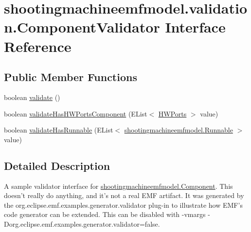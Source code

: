 \hypertarget{interfaceshootingmachineemfmodel_1_1validation_1_1_component_validator}{\section{shootingmachineemfmodel.\-validation.\-Component\-Validator Interface Reference}
\label{interfaceshootingmachineemfmodel_1_1validation_1_1_component_validator}
}
\subsection*{Public Member Functions}
\begin{DoxyCompactItemize}
\item 
boolean \hyperlink{interfaceshootingmachineemfmodel_1_1validation_1_1_component_validator_af928d64ea60f47967c2502b0d1013e4d}{validate} ()
\item 
boolean \hyperlink{interfaceshootingmachineemfmodel_1_1validation_1_1_component_validator_a1bc0a27508bdf6a7a5662d8d459078df}{validate\-Has\-H\-W\-Ports\-Component} (E\-List$<$ \hyperlink{interfaceshootingmachineemfmodel_1_1_h_w_ports}{H\-W\-Ports} $>$ value)
\item 
boolean \hyperlink{interfaceshootingmachineemfmodel_1_1validation_1_1_component_validator_a6e4a98342afdde36eda8ef95f937a9b4}{validate\-Has\-Runnable} (E\-List$<$ \hyperlink{interfaceshootingmachineemfmodel_1_1_runnable}{shootingmachineemfmodel.\-Runnable} $>$ value)
\end{DoxyCompactItemize}


\subsection{Detailed Description}
A sample validator interface for \hyperlink{interfaceshootingmachineemfmodel_1_1_component}{shootingmachineemfmodel.\-Component}. This doesn't really do anything, and it's not a real E\-M\-F artifact. It was generated by the org.\-eclipse.\-emf.\-examples.\-generator.\-validator plug-\/in to illustrate how E\-M\-F's code generator can be extended. This can be disabled with -\/vmargs -\/\-Dorg.\-eclipse.\-emf.\-examples.\-generator.\-validator=false. 

